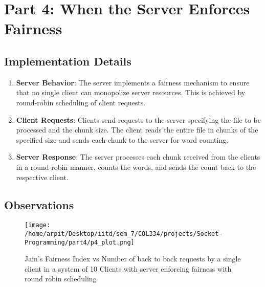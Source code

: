 \documentclass[12pt]{article}
\begin{document}
\section{Part 4: When the Server Enforces Fairness}

\subsection{Implementation Details}
\begin{enumerate}
    \item \textbf{Server Behavior}: The server implements a fairness mechanism to ensure that no single client can monopolize server resources. This is achieved by round-robin scheduling of client requests.
    \item \textbf{Client Requests}: Clients send requests to the server specifying the file to be processed and the chunk size. The client reads the entire file in chunks of the specified size and sends each chunk to the server for word counting.
    \item \textbf{Server Response}: The server processes each chunk received from the clients in a round-robin manner, counts the words, and sends the count back to the respective client.
\end{enumerate}

\subsection{Observations}

\begin{figure}[h!]
    \centering
    \texttt{[image: /home/arpit/Desktop/iitd/sem\_7/COL334/projects/Socket-Programming/part4/p4\_plot.png]}
    \caption{Jain's Fairness Index vs Number of back to back requests by a single client in a system of 10 Clients with server enforcing fairness with round robin scheduling}
    \label{fig:part4_output}
\end{figure}
\end{document}
